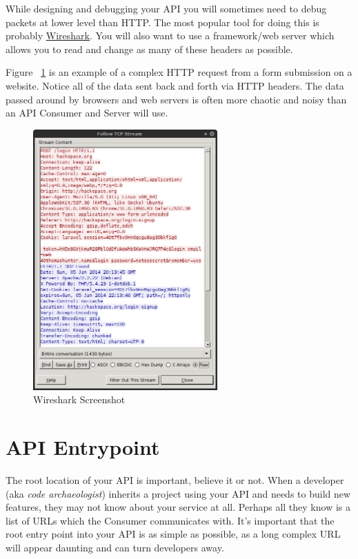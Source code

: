\documentclass{book}
\begin{document}
While designing and debugging your API you will sometimes need to debug packets at lower level than HTTP. The most popular tool for doing this is probably \href{https://www.wireshark.org}{Wireshark}. You will also want to use a framework/web server which allows you to read and change as many of these headers as possible.

Figure ~\ref{fig:wireshark} is an example of a complex HTTP request from a form submission on a website. Notice all of the data sent back and forth via HTTP headers. The data passed around by browsers and web servers is often more chaotic and noisy than an API Consumer and Server will use.

\begin{figure}[ht!]
\centering
\includegraphics[height=100mm]{images/wireshark.png}
\caption{Wireshark Screenshot}
\label{fig:wireshark}
\end{figure}


\section{API Entrypoint}

The root location of your API is important, believe it or not. When a developer (aka \emph{code archaeologist}) inherits a project using your API and needs to build new features, they may not know about your service at all. Perhaps all they know is a list of URLs which the Consumer communicates with. It's important that the root entry point into your API is as simple as possible, as a long complex URL will appear daunting and can turn developers away.
\end{document}
